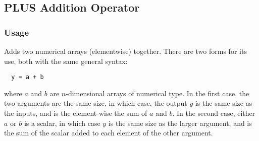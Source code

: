 %
%
%
\subsection{PLUS Addition Operator}
\subsubsection{Usage}
Adds two numerical arrays (elementwise) together.  There are two forms
for its use, both with the same general syntax:
\begin{verbatim}
  y = a + b
\end{verbatim}
where $a$ and $b$ are $n$-dimensional arrays of numerical type.  In the
first case, the two arguments are the same size, in which case, the 
output $y$ is the same size as the inputs, and is the element-wise the sum 
of $a$ and $b$.  In the second case, either $a$ or $b$ is a scalar, 
in which case $y$ is the same size as the larger argument,
and is the sum of the scalar added to each element of the other argument.

